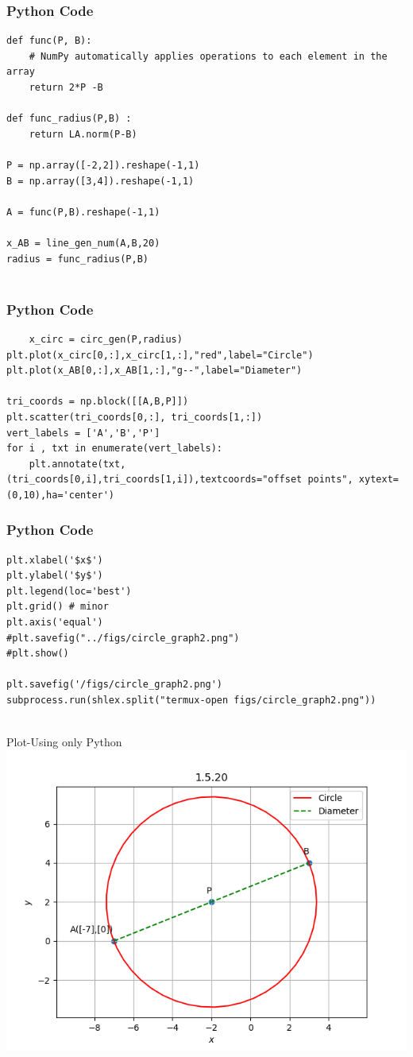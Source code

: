 \documentclass{beamer}
\begin{document}
\begin{frame}[fragile]
    \frametitle{Python Code}
    \begin{lstlisting}
def func(P, B):
    # NumPy automatically applies operations to each element in the array
    return 2*P -B

def func_radius(P,B) :
    return LA.norm(P-B)

P = np.array([-2,2]).reshape(-1,1)
B = np.array([3,4]).reshape(-1,1)

A = func(P,B).reshape(-1,1)

x_AB = line_gen_num(A,B,20)
radius = func_radius(P,B)


\end{lstlisting}
\end{frame}

\begin{frame}[fragile]
    \frametitle{Python Code}
    \begin{lstlisting}
    x_circ = circ_gen(P,radius)
plt.plot(x_circ[0,:],x_circ[1,:],"red",label="Circle")
plt.plot(x_AB[0,:],x_AB[1,:],"g--",label="Diameter")

tri_coords = np.block([[A,B,P]])
plt.scatter(tri_coords[0,:], tri_coords[1,:])
vert_labels = ['A','B','P']
for i , txt in enumerate(vert_labels):
    plt.annotate(txt,(tri_coords[0,i],tri_coords[1,i]),textcoords="offset points", xytext=(0,10),ha='center')
\end{lstlisting}
\end{frame}

\begin{frame}[fragile]
    \frametitle{Python Code }
    \begin{lstlisting}
plt.xlabel('$x$')
plt.ylabel('$y$')
plt.legend(loc='best')
plt.grid() # minor
plt.axis('equal')
#plt.savefig("../figs/circle_graph2.png")
#plt.show()

plt.savefig('/figs/circle_graph2.png')
subprocess.run(shlex.split("termux-open figs/circle_graph2.png"))


    \end{lstlisting}
\end{frame}


\begin{frame}{Plot-Using only Python}
    \centering
    \includegraphics[width=\columnwidth, height=0.8\textheight, keepaspectratio]{figs/circle_graph2.png}     
\end{frame}
\end{document}
